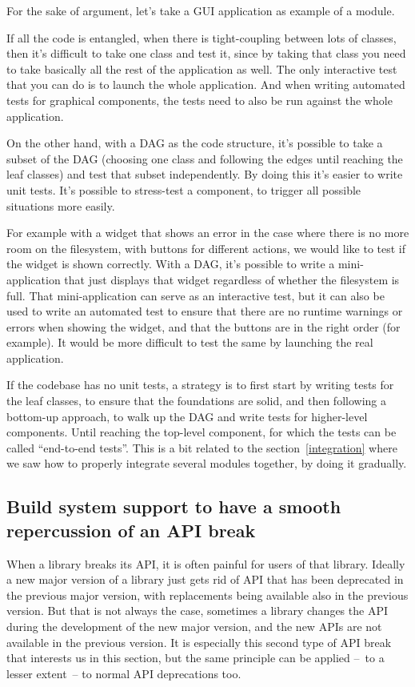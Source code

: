 \documentclass[a4paper,11pt]{article}
\begin{document}
For the sake of argument, let's take a GUI application as example of a module.

If all the code is entangled, when there is tight-coupling between lots of classes, then it's difficult to take one class and test it, since by taking that class you need to take basically all the rest of the application as well. The only interactive test that you can do is to launch the whole application. And when writing automated tests for graphical components, the tests need to also be run against the whole application.

On the other hand, with a DAG as the code structure, it's possible to take a subset of the DAG (choosing one class and following the edges until reaching the leaf classes) and test that subset independently. By doing this it's easier to write unit tests. It's possible to stress-test a component, to trigger all possible situations more easily.

For example with a widget that shows an error in the case where there is no more room on the filesystem, with buttons for different actions, we would like to test if the widget is shown correctly. With a DAG, it's possible to write a mini-application that just displays that widget regardless of whether the filesystem is full. That mini-application can serve as an interactive test, but it can also be used to write an automated test to ensure that there are no runtime warnings or errors when showing the widget, and that the buttons are in the right order (for example). It would be more difficult to test the same by launching the real application.

If the codebase has no unit tests, a strategy is to first start by writing tests for the leaf classes, to ensure that the foundations are solid, and then following a bottom-up approach, to walk up the DAG and write tests for higher-level components. Until reaching the top-level component, for which the tests can be called ``end-to-end tests''. This is a bit related to the section~\ref{integration} where we saw how to properly integrate several modules together, by doing it gradually.

\subsection{Build system support to have a smooth repercussion of an API break}

When a library breaks its API, it is often painful for users of that library. Ideally a new major version of a library just gets rid of API that has been deprecated in the previous major version, with replacements being available also in the previous version. But that is not always the case, sometimes a library changes the API during the development of the new major version, and the new APIs are not available in the previous version. It is especially this second type of API break that interests us in this section, but the same principle can be applied --~to a lesser extent~-- to normal API deprecations too.
\end{document}

